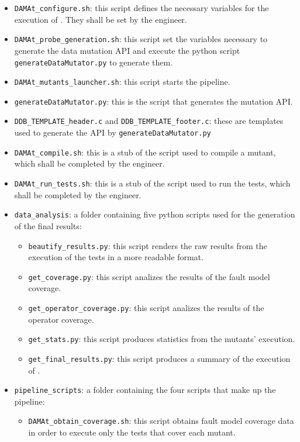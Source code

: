 \begin{itemize}
	\item \texttt{DAMAt\_configure.sh}: this script defines the necessary variables for the execution of \DAMA. They shall be set by the engineer.
	\item \texttt{DAMAt\_probe\_generation.sh}: this script set the variables necessary to generate the data mutation API and execute the python script \texttt{generateDataMutator.py} to generate them.
	\item \texttt{DAMAt\_mutants\_launcher.sh}: this script starts the \DAMA pipeline.
	\item \texttt{generateDataMutator.py}: this is the script that generates the \DAMA mutation API.
	\item \texttt{DDB\_TEMPLATE\_header.c} and \texttt{DDB\_TEMPLATE\_footer.c}: these are templates used to generate the \DAMA API by \texttt{generateDataMutator.py}
	\item \texttt{DAMAt\_compile.sh}: this is a stub of the script used to compile a mutant, which shall be completed by the engineer.
	\item \texttt{DAMAt\_run\_tests.sh}: this is a stub of the script used to run the tests, which shall be completed by the engineer.
	\item \texttt{data\_analysis}: a folder containing five python scripts used for the generation of the final results:
	\begin{itemize}
	  \item \texttt{beautify\_results.py}: this script renders the raw results from the execution of the tests in a more readable format.
	  \item \texttt{get\_coverage.py}: this script analizes the results of the fault model coverage.
	  \item \texttt{get\_operator\_coverage.py}: this script analizes the results of the operator coverage.
	  \item \texttt{get\_stats.py}: this script produces statistics from the mutants' execution.
		\item \texttt{get\_final\_results.py}: this script produces a summary of the execution of \DAMA.
	\end{itemize}
	\item \texttt{pipeline\_scripts}: a folder containing the four scripts that make up the \DAMA pipeline:
	\begin{itemize}
		\item \texttt{DAMAt\_obtain\_coverage.sh}: this script obtains fault model coverage data in order to execute only the tests that cover each mutant.

\end{itemize}
\end{itemize}
